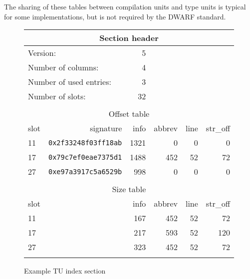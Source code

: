 The sharing of these tables between compilation units and type units
is typical for some implementations, but is not required by the
DWARF standard.

\begin{figure}[ht]
\begin{center}
\begin{tabular}{lrrrrr}
\\
  \multicolumn{6}{c}{Section header} \\
\hline
  \multicolumn{2}{l}{Version:}&                 5 \\
  \multicolumn{2}{l}{Number of columns:}&       4 \\
  \multicolumn{2}{l}{Number of used entries:}&  3 \\
  \multicolumn{2}{l}{Number of slots:}&         32 \\
\\
  \multicolumn{6}{c}{Offset table} \\
  \hline
  slot&  signature&                    info&   abbrev&     line& str\_off \\
  11& \texttt{0x2f33248f03ff18ab}&     1321&        0&        0&        0 \\
  17& \texttt{0x79c7ef0eae7375d1}&     1488&      452&       52&       72 \\
  27& \texttt{0xe97a3917c5a6529b}&      998&        0&        0&        0 \\
\\
  \multicolumn{6}{c}{Size table} \\
  \hline
  slot&                          &     info&   abbrev&     line& str\_off \\
  11&                            &      167&      452&       52&       72 \\
  17&                            &      217&      593&       52&      120 \\
  27&                            &      323&      452&       52&       72 \\
\\
\hline
\end{tabular}
\end{center}
\caption{Example TU index section}
\label{fig:exampletuindexsection}
\end{figure}

